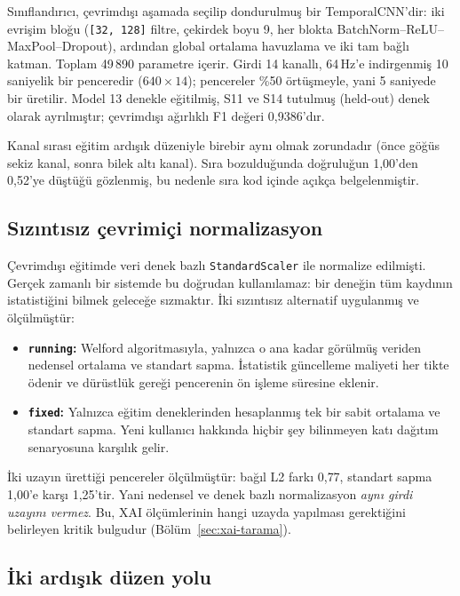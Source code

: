 \documentclass[conference]{IEEEtran}
\begin{document}
Sınıflandırıcı, çevrimdışı aşamada seçilip dondurulmuş bir TemporalCNN'dir:
iki evrişim bloğu (\texttt{[32, 128]} filtre, çekirdek boyu 9, her blokta
BatchNorm--ReLU--MaxPool--Dropout), ardından global ortalama havuzlama ve iki
tam bağlı katman. Toplam 49\,890 parametre içerir. Girdi 14 kanallı, 64\,Hz'e
indirgenmiş 10 saniyelik bir penceredir ($640\times14$); pencereler \%50
örtüşmeyle, yani 5 saniyede bir üretilir. Model 13 denekle eğitilmiş, S11 ve S14
tutulmuş (held-out) denek olarak ayrılmıştır; çevrimdışı ağırlıklı F1 değeri
0{,}9386'dır.

Kanal sırası eğitim ardışık düzeniyle birebir aynı olmak zorundadır (önce göğüs
sekiz kanal, sonra bilek altı kanal). Sıra bozulduğunda doğruluğun 1{,}00'den
0{,}52'ye düştüğü gözlenmiş, bu nedenle sıra kod içinde açıkça belgelenmiştir.

\subsection{Sızıntısız çevrimiçi normalizasyon}

Çevrimdışı eğitimde veri denek bazlı \texttt{StandardScaler} ile normalize
edilmişti. Gerçek zamanlı bir sistemde bu doğrudan kullanılamaz: bir deneğin tüm
kaydının istatistiğini bilmek geleceğe sızmaktır. İki sızıntısız alternatif
uygulanmış ve ölçülmüştür:

\begin{itemize}
\item \textbf{\texttt{running}:} Welford algoritmasıyla, yalnızca o ana kadar
görülmüş veriden nedensel ortalama ve standart sapma. İstatistik güncelleme
maliyeti her tikte ödenir ve dürüstlük gereği pencerenin ön işleme süresine
eklenir.
\item \textbf{\texttt{fixed}:} Yalnızca eğitim deneklerinden hesaplanmış tek bir
sabit ortalama ve standart sapma. Yeni kullanıcı hakkında hiçbir şey
bilinmeyen katı dağıtım senaryosuna karşılık gelir.
\end{itemize}

İki uzayın ürettiği pencereler ölçülmüştür: bağıl L2 farkı 0{,}77, standart
sapma 1{,}00'e karşı 1{,}25'tir. Yani nedensel ve denek bazlı normalizasyon
\emph{aynı girdi uzayını vermez}. Bu, XAI ölçümlerinin hangi uzayda yapılması
gerektiğini belirleyen kritik bulgudur (Bölüm~\ref{sec:xai-tarama}).

\subsection{İki ardışık düzen yolu}
\end{document}
